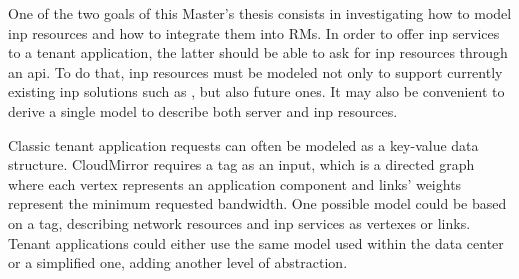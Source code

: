One of the two goals of this Master's thesis consists in investigating how to model \gls{inp} resources and how to integrate them into RMs.
In order to offer \gls{inp} services to a tenant application, the latter should be able to ask for \gls{inp} resources through an \gls{api}.
To do that, \gls{inp} resources must be modeled not only to support currently existing \gls{inp} solutions such as \cite{daiet} \cite{netchain} \cite{incbricks} \cite{sharp}, but also future ones. 
It may also be convenient to derive a single model to describe both server and \gls{inp} resources.

Classic tenant application requests can often be modeled as a key-value data structure.
CloudMirror \cite{cloudmirror} requires a \gls{tag} as an input, which is a directed graph where each vertex represents an application component and links' weights represent the minimum requested bandwidth.
One possible model could be based on a \gls{tag}, describing network resources and \gls{inp} services as vertexes or links.
Tenant applications could either use the same model used within the data center or a simplified one, adding another level of abstraction.
